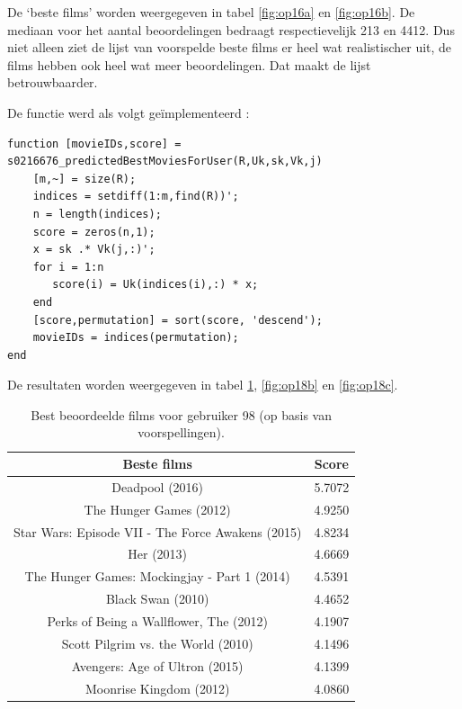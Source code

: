 \restoregeometry

\newpage
{}

De `beste films' worden weergegeven in tabel \ref{fig:op16a} en \ref{fig:op16b}. De mediaan voor het aantal beoordelingen bedraagt respectievelijk 213 en 4412. Dus niet alleen ziet de lijst van voorspelde beste films er heel wat realistischer uit, de films hebben ook heel wat meer beoordelingen. Dat maakt de lijst betrouwbaarder.



De functie werd als volgt ge\"implementeerd :

\begin{lstlisting}
function [movieIDs,score] = s0216676_predictedBestMoviesForUser(R,Uk,sk,Vk,j)
    [m,~] = size(R);
    indices = setdiff(1:m,find(R))';
    n = length(indices);
    score = zeros(n,1);
    x = sk .* Vk(j,:)';
    for i = 1:n
       score(i) = Uk(indices(i),:) * x;
    end
    [score,permutation] = sort(score, 'descend');
    movieIDs = indices(permutation);
end
\end{lstlisting}



De resultaten worden weergegeven in tabel \ref{fig:op18a}, \ref{fig:op18b} en \ref{fig:op18c}.


\begin{table}[H]
\centering
\begin{tabular}{c|c}
\textbf{Beste films} & \textbf{Score} \\
\hline
    Deadpool (2016)                                   & 5.7072 \\
    The Hunger Games (2012)                           & 4.9250 \\
    Star Wars: Episode VII - The Force Awakens (2015) & 4.8234 \\
    Her (2013)                                        & 4.6669 \\
    The Hunger Games: Mockingjay - Part 1 (2014)      & 4.5391 \\
    Black Swan (2010)                                 & 4.4652 \\
    Perks of Being a Wallflower, The (2012)           & 4.1907 \\
    Scott Pilgrim vs. the World (2010)                & 4.1496 \\
    Avengers: Age of Ultron (2015)                    & 4.1399 \\
    Moonrise Kingdom (2012)                           & 4.0860 
\end{tabular}
\caption{Best beoordeelde films voor gebruiker 98 (op basis van voorspellingen).}
\label{fig:op18a}
\end{table}

